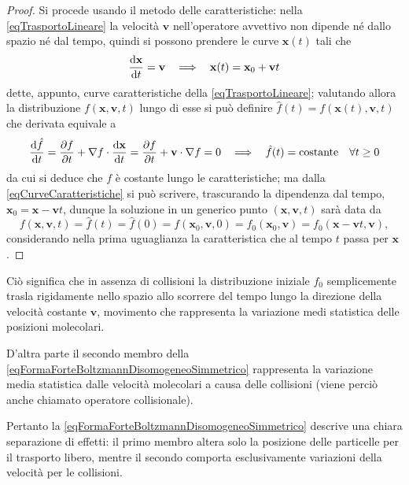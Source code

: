             \begin{proof}
                Si procede usando il metodo delle caratteristiche: nella \eqref{eqTrasportoLineare} la velocità \(\mathbf v\) nell'operatore avvettivo non dipende né dallo spazio né dal tempo, quindi si possono prendere le curve \(\mathbf x(t)\) tali che
                \begin{equation}
                    \label{eqCurveCaratteristiche}
                    \frac{\mathrm{d}\mathbf x}{\mathrm{d}t}=\mathbf v\ \ \implies\ \ \mathbf x(t)=\mathbf x_0+\mathbf vt
                \end{equation}
                dette, appunto, curve caratteristiche della \eqref{eqTrasportoLineare}; valutando allora la distribuzione \(f(\mathbf x,\mathbf v,t)\) lungo di esse si può definire \(\hat f(t)=f(\mathbf x(t),\mathbf v,t)\) che derivata equivale a
                \[
                    \frac{\mathrm{d}\hat f}{\mathrm{d}t}=\frac{\partial f}{\partial t}+\nabla f\cdot\frac{\mathrm{d}\mathbf x}{\mathrm{d}t}=\frac{\partial f}{\partial t}+\mathbf v\cdot\nabla f=0
                    \ \ \implies\ \ \hat f(t)=\text{costante}\quad\forall t\geq0
                \]
                da cui si deduce che \(f\) è costante lungo le caratteristiche; ma dalla \eqref{eqCurveCaratteristiche} si può scrivere, trascurando la dipendenza dal tempo, \(\mathbf x_0=\mathbf x-\mathbf vt\), dunque la soluzione in un generico punto \((\mathbf x,\mathbf v,t)\) sarà data da
                \[
                    f(\mathbf x,\mathbf v,t)
                    =\hat f(t)=\hat f(0)
                    =f(\mathbf x_0,\mathbf v,0)
                    =f_0(\mathbf x_0,\mathbf v)
                    =f_0(\mathbf x-\mathbf vt,\mathbf v),
                \]
                considerando nella prima uguaglianza la caratteristica che al tempo \(t\) passa per \(\mathbf x\).
            \end{proof}

            Ciò significa che in assenza di collisioni la distribuzione iniziale \(f_0\) semplicemente trasla rigidamente nello spazio allo scorrere del tempo lungo la direzione della velocità costante \(\mathbf v\), movimento che rappresenta la variazione medi statistica delle posizioni molecolari.

            D'altra parte il secondo membro della \eqref{eqFormaForteBoltzmannDisomogeneoSimmetrico} rappresenta la variazione media statistica dalle velocità molecolari a causa delle collisioni (viene perciò anche chiamato operatore collisionale).
            
            Pertanto la \eqref{eqFormaForteBoltzmannDisomogeneoSimmetrico} descrive una chiara separazione di effetti: il primo membro altera solo la posizione delle particelle per il trasporto libero, mentre il secondo comporta esclusivamente variazioni della velocità per le collisioni.

